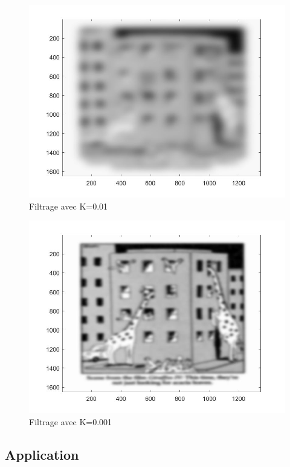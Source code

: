 \documentclass[10pt,a4paper]{article}
\begin{document}
\begin{figure}[H]	\begin{center}
\includegraphics[scale=0.35]{imfiltree_k=0.01.jpg}
\caption{Filtrage avec K=0.01}
\label{XX}
\end{center}	\end{figure}

\begin{figure}[H]	\begin{center}
\includegraphics[scale=0.35]{imfiltree_k=0.001.jpg}
\caption{Filtrage avec K=0.001}
\label{XX}
\end{center}	\end{figure}

\subsection{Application}
\end{document}
